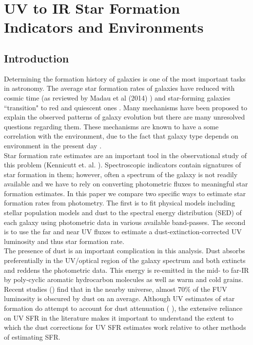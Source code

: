 \chapter{UV to IR Star Formation Indicators and Environments}
\label{ch:sfrk}

\newpage
\section{Introduction}
Determining the formation history of galaxies is one of the most important tasks in astronomy. The average star formation rates of galaxies have reduced with cosmic time (as reviewed by Madau et al (2014) \citep{madau_cosmic_2014}) and star-forming galaxies ``transition" to red and quiescent ones \citep[\emph{e.g.}][among others]{ilbert_mass_2013, muzzin_evolution_2013, moustakas_primus_2013, tomczak_galaxy_2014}. Many mechanisms have been proposed to explain the observed patterns of galaxy evolution but there are many unresolved questions regarding them. These mechanisms are known to have a some correlation with the environment, due to the fact that galaxy type depends on environment in the present day \citep{dressler_galaxy_1980, blanton_physical_2009-1}.\\

Star formation rate estimates are an important tool in the observational study of this problem (Kennicutt et. al. \citep{kennicutt_star_2012}). Spectroscopic indicators contain signatures of star formation in them; however, often a spectrum of the galaxy is not readily available and we have to rely on converting photometric fluxes to meaningful star formation estimates. In this paper we compare two specific ways to estimate star formation rates from photometry. The first is to fit physical models including stellar population models and dust to the spectral energy distribution (SED) of each galaxy using photometric data in various available band-passes. The second is to use the far and near UV fluxes to estimate a dust-extinction-corrected UV luminosity and thus star formation rate.\\

The presence of dust is an important complication in this analysis. Dust absorbs preferentially in the UV/optical region of the galaxy spectrum and both extincts and reddens the photometric data. This energy is re-emitted in the mid- to far-IR by poly-cyclic aromatic hydrocarbon molecules as well as warm and cold grains. Recent studies (\citet{burgarella_herschel_2013}) find that in the nearby universe, almost $70\%$ of the FUV luminosity is obscured by dust on an average. Although UV estimates of star formation do attempt to account for dust attenuation (\citet{salim_uv_2007-1} ), the extensive reliance on UV SFR in the literature \citep[\emph{e.g.}][among others]{peng_mass_2010, moustakas_primus_2013, karim_star_2011, lee_comparison_2009, wyder_uvoptical_2007} makes it important to understand the extent to which the dust corrections for UV SFR estimates work relative to other methods of estimating SFR.\\

